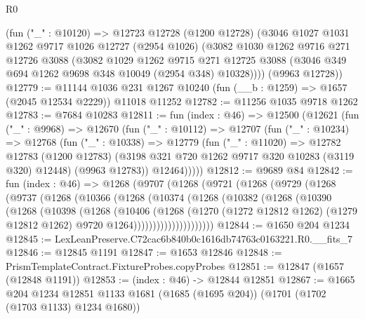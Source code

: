 \begin{lexlean}{R0}
\begin{coremodule}
    (fun ("_" : @10120) =>
    @12723
      @12728
      (@1200 @12728)
      (@3046
        @1027
        @1031
        @1262
        @9717
        @1026
        @12727
        (@2954 @1026)
        (@3082
          @1030
          @1262
          @9716
          @271
          @12726
          @3088
          (@3082
            @1029
            @1262
            @9715
            @271
            @12725
            @3088
            (@3046 @349 @694 @1262 @9698 @348 @10049 (@2954 @348) @10328))))
      (@9963 @12728))
@12779 := @11144
    @1036
    @231
    @1267
    @10240
    (fun (__b : @1259) => @1657 (@2045 @12534 @2229))
    @11018
    @11252
@12782 := @11256 @1035 @9718 @1262
@12783 := @7684 @10283
@12811 := fun (index : @46) =>
  @12500
    (@12621
      (fun ("_" : @9968) =>
      @12670
        (fun ("_" : @10112) =>
        @12707
          (fun ("_" : @10234) =>
          @12768
            (fun ("_" : @10338) =>
            @12779
              (fun ("_" : @11020) =>
              @12782
                @12783
                (@1200 @12783)
                (@3198 @321 @720 @1262 @9717 @320 @10283 (@3119 @320) @12448)
                (@9963 @12783))
              @12464)))))
@12812 := @9689 @84
@12842 := fun (index : @46) =>
  @1268
    (@9707
      (@1268
        (@9721
          (@1268
            (@9729
              (@1268
                (@9737
                  (@1268
                    (@10366
                      (@1268
                        (@10374
                          (@1268
                            (@10382
                              (@1268
                                (@10390
                                  (@1268
                                    (@10398
                                      (@1268
                                        (@10406
                                          (@1268
                                            (@1270
                                              (@1272 @12812 @1262)
                                              (@1279 @12812 @1262)
                                              @9720
                                              @1264)))))))))))))))))))))
@12844 := @1650 @204 @1234
@12845 := LexLeanPreserve.C72cac6b840b0c1616db74763c0163221.R0.__fits_7
@12846 := @12845 @1191
@12847 := @1653 @12846
@12848 := PrismTemplateContract.FixtureProbes.copyProbes
@12851 := @12847 (@1657 (@12848 @1191))
@12853 := (index : @46) -> @12844 @12851
@12867 := @1665
    @204
    @1234
    @12851
    @1133
    @1681
    (@1685 (@1695 @204))
    (@1701 (@1702 (@1703 @1133) @1234 @1680))

\end{coremodule}
\end{lexlean}
